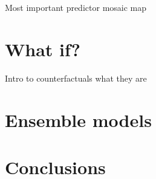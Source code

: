 \documentclass[12pt, smalloffset, compress, aspectratio=1610]{beamer}
\begin{document}
\begin{frame}{Most important predictor}
\label{most-important-predictor}
mosaic map
\end{frame}

\section{What if?}\label{what-if}

\begin{frame}{Intro to counterfactuals}
\label{intro-to-counterfactuals}
what they are
\end{frame}

\section{Ensemble models}\label{ensemble-models}

\section{Conclusions}\label{conclusions}
\end{document}
